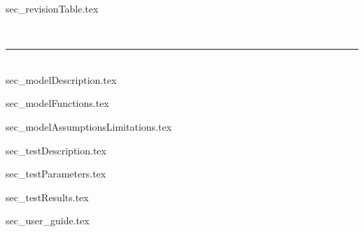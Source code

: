 




\makeCover

{sec_revisionTable.tex}

\newpage
\setcounter{page}{1}
\pagestyle{fancy}

\tableofcontents %
~\\ \hrule ~\\ %
	
{sec_modelDescription.tex} %

{sec_modelFunctions.tex} %

{sec_modelAssumptionsLimitations.tex} %

{sec_testDescription.tex} %

{sec_testParameters.tex}

{sec_testResults.tex} %

{sec_user_guide.tex} %



